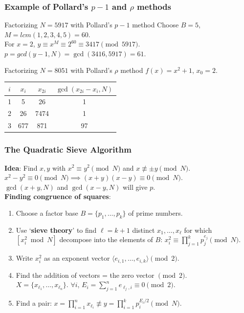 \begin{frame}\frametitle{Example of Pollard's $p-1$ and $\rho$ methods}
\begin{exampleblock}{Factorizing $N=5917$ with Pollard's $p-1$ method}
Choose $B=5$, $M=lcm(1,2,3,4,5)=60$.\\
For $x=2$, $y \equiv x^M \equiv 2^{60} \equiv 3417 \pmod{5917}$.\\
$p = gcd(y-1,N) = \gcd(3416,5917) = 61$.
\end{exampleblock}
\begin{exampleblock}{Factorizing $N=8051$ with Pollard's $\rho$ method}
$f(x) = x^2+1$, $x_0=2$.\\
\begin{center}
\begin{tabular}{|c|c|c|c|} \hline
$i$  & $x_i$ & $x_{2i}$ & $\gcd(x_{2i}-x_i,N)$ \\ \hline
1 & 5 & 26 & 1 \\
2 & 26 & 7474 & 1 \\
3 & 677 & 871 & 97 \\ \hline
\end{tabular}	
\end{center}
\end{exampleblock}
\end{frame}
\begin{frame}\frametitle{The Quadratic Sieve Algorithm}
\textbf{Idea}: Find $x,y$ with $x^2 \equiv y^2 \pmod N$ and $x \not \equiv \pm y \pmod N$. $x^2-y^2 \equiv 0 \pmod N\implies (x+y)(x-y) \equiv 0 \pmod N$.\\
$\gcd(x+y,N)$ and $\gcd(x-y,N)$ will give $p$.\\
\textbf{Finding congruence of squares}: \\
\begin{enumerate}
\item Choose a factor base $B = \{p_1,\dotsc,p_k\}$ of prime numbers. 
\item Use `\textbf{sieve theory}' to find $\ell = k+1$ distinct $x_1,\dotsc,x_\ell$ for which $[x_i^2 \bmod N]$ decompose into the elements of $B$: $x_i^2 \equiv \prod^k_{j=1} p_j^{e_j} \pmod N$.
\item Write $x_i^2$ as an exponent vector $\langle e_{i,1},\dotsc,e_{i,k}\rangle \pmod 2$.
\item Find the addition of vectors = the zero vector $\pmod 2$.\\
$X=\{x_{\ell_1},\dotsc,x_{\ell_n}\}$. $\forall i$, $E_i = \sum_{j=1}^ne_{\ell_j,i} \equiv 0 \pmod 2$.
\item Find a pair: $x = \prod_{i=1}^nx_{\ell_i} \not \equiv y=\prod_{i=1}^kp_i^{E_i/2} \pmod N$.  
\end{enumerate}
\end{frame}
